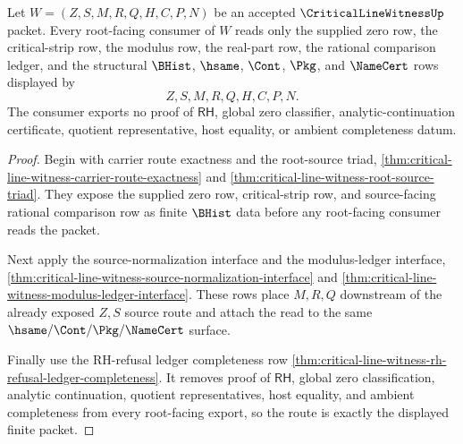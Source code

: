 \begin{theorem}
\label{thm:critical-line-witness-root-finite-route-totality}
Let $W=(Z,S,M,R,Q,H,C,P,N)$ be an accepted $\CriticalLineWitnessUp$ packet.
Every root-facing consumer of $W$ reads only the supplied zero row, the
critical-strip row, the modulus row, the real-part row, the rational
comparison ledger, and the structural $\BHist$, $\hsame$, $\Cont$, $\Pkg$,
and $\NameCert$ rows displayed by
$$
Z,S,M,R,Q,H,C,P,N.
$$
The consumer exports no proof of $\mathsf{RH}$, global zero classifier,
analytic-continuation certificate, quotient representative, host equality, or
ambient completeness datum.
\end{theorem}
\begin{proof}
Begin with carrier route exactness and the root-source triad,
\autoref{thm:critical-line-witness-carrier-route-exactness} and
\autoref{thm:critical-line-witness-root-source-triad}. They expose the
supplied zero row, critical-strip row, and source-facing rational comparison
row as finite $\BHist$ data before any root-facing consumer reads the packet.

Next apply the source-normalization interface and the modulus-ledger
interface,
\autoref{thm:critical-line-witness-source-normalization-interface} and
\autoref{thm:critical-line-witness-modulus-ledger-interface}. These rows place
$M,R,Q$ downstream of the already exposed $Z,S$ source route and attach the
read to the same $\hsame/\Cont/\Pkg/\NameCert$ surface.

Finally use the RH-refusal ledger completeness row
\autoref{thm:critical-line-witness-rh-refusal-ledger-completeness}. It removes
proof of $\mathsf{RH}$, global zero classification, analytic continuation,
quotient representatives, host equality, and ambient completeness from every
root-facing export, so the route is exactly the displayed finite packet.
\end{proof}

